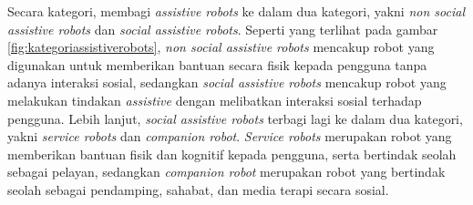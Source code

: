 Secara kategori, \citet{cit:heerink2010} membagi \emph{assistive robots} ke dalam dua kategori,
  yakni \emph{non social assistive robots} dan \emph{social assistive robots}.
Seperti yang terlihat pada gambar \ref{fig:kategoriassistiverobots},
\emph{non social assistive robots} mencakup robot yang digunakan untuk memberikan bantuan secara fisik kepada pengguna tanpa adanya interaksi sosial,
  sedangkan \emph{social assistive robots} mencakup robot yang melakukan tindakan \emph{assistive} dengan melibatkan interaksi sosial terhadap pengguna.
Lebih lanjut, \emph{social assistive robots} terbagi lagi ke dalam dua kategori,
  yakni \emph{service robots} dan \emph{companion robot}.
\emph{Service robots} merupakan robot yang memberikan bantuan fisik dan kognitif kepada pengguna,
  serta bertindak seolah sebagai pelayan,
  sedangkan \emph{companion robot} merupakan robot yang bertindak seolah sebagai pendamping,
  sahabat, dan media terapi secara sosial.

